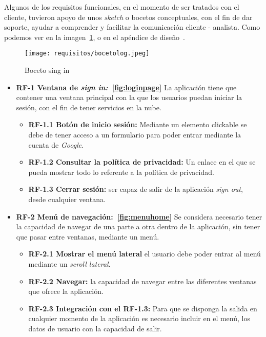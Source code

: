 Algunos de los requisitos funcionales, en el momento de ser tratados con el cliente, tuvieron apoyo de unos \emph{sketch} o bocetos conceptuales, con el fin de dar soporte, ayudar a comprender y facilitar la comunicación cliente - analista. Como podemos ver en la imagen~\ref{fig:bocetolog}, o en el apéndice de diseño~\pageref{diseño}.

\begin{figure}[H]
	\centering
	\texttt{[image: requisitos/bocetolog.jpeg]}
	\caption{Boceto sing in}\label{fig:bocetolog}
\end{figure}

\begin{itemize}
\tightlist
	\item \textbf{RF-1 Ventana de \emph{sign in:}~\ref{fig:loginpage}} La aplicación tiene que contener una ventana principal con la que los usuarios puedan iniciar la sesión, con el fin de tener servicios en la nube.
	
	\begin{itemize}
	\tightlist
	\item \textbf{RF-1.1 Botón de inicio sesión:} Mediante un elemento clickable se debe de tener acceso a un formulario para poder entrar mediante la cuenta de \emph{Google}.
	\item \textbf{RF-1.2 Consultar la política de privacidad:} Un enlace en el que se pueda mostrar todo lo referente a la política de privacidad.
	\item \textbf{RF-1.3 Cerrar sesión:} ser capaz de salir de la aplicación \emph{sign out}, desde cualquier ventana.
	\end{itemize}
	
	\item \textbf{RF-2 Menú de navegación:~\ref{fig:menuhome}} Se considera necesario tener la capacidad de navegar de una parte a otra dentro de la aplicación, sin tener que pasar entre ventanas, mediante un menú. 
	
	\begin{itemize}
		\tightlist
		\item \textbf{RF-2.1 Mostrar el menú lateral} el usuario debe poder entrar al menú mediante un \emph{scroll lateral}.
		\item \textbf{RF-2.2 Navegar:} la capacidad de navegar entre las diferentes ventanas que ofrece la aplicación.
		\item \textbf{RF-2.3 Integración con el RF-1.3:} Para que se disponga la salida en cualquier momento de la aplicación es necesario incluir en el menú, los datos de usuario con la capacidad de salir.
	\end{itemize}


\end{itemize}
